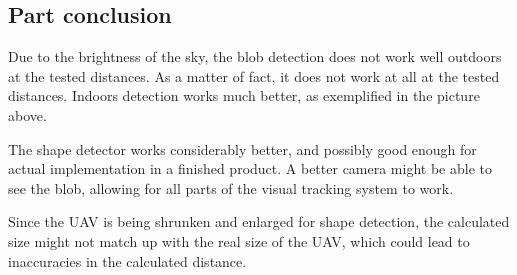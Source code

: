 \subsection{Part conclusion}
Due to the brightness of the sky, the blob detection does not work well outdoors at the tested distances. As a matter of fact, it does not work at all at the tested distances. Indoors detection works much better, as exemplified in the picture above. 

The shape detector works considerably better, and possibly good enough for actual implementation in a finished product. A better camera might be able to see the blob, allowing for all parts of the visual tracking system to work.

Since the UAV is being shrunken and enlarged for shape detection, the calculated size might not match up with the real size of the UAV, which could lead to inaccuracies in the calculated distance.